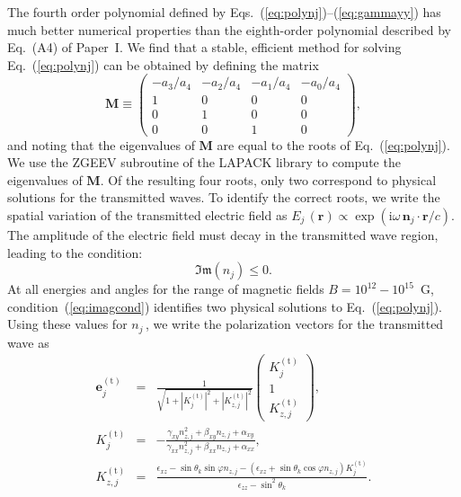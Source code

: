 \documentclass{aa}
\newcommand{\req}[1]{Eq.~(\ref{#1})}
\newcommand{\etrv}{\bm{e}^\mathrm{(t)}}
\begin{document}
The fourth order polynomial defined by
Eqs.~(\ref{eq:polynj})--(\ref{eq:gammayy}) has much
better numerical properties than the eighth-order polynomial
described by Eq.~(A4) of Paper~I.   We find that a
stable, efficient method for solving
\req{eq:polynj} can be obtained by  defining the
matrix
\begin{equation}
\mathbf{M} \equiv \left(\begin{array}{cccc}
-a_3/a_4 & -a_2/a_4 & -a_1/a_4 & -a_0/a_4\\
1 & 0 & 0 & 0\\
0 & 1 & 0 & 0\\
0 & 0 & 1 & 0
\end{array}\right),
\end{equation}
and noting that the eigenvalues of $\mathbf{M}$ are equal to
the roots of \req{eq:polynj}. We use the ZGEEV
subroutine of the  LAPACK library \citep{Anderson-ea99} to
compute the eigenvalues of $\mathbf{M}$. Of the resulting
four roots, only two correspond to physical solutions  for
the transmitted waves.  To identify the correct roots, we
write the spatial  variation of the transmitted electric
field as  $E_j\,(\bm{r}) \propto
\exp\left(\mathrm{i}\omega\,\bm{n}_j\cdot\bm{r}/c\right)$. 
The amplitude of  the electric field must decay in the
transmitted wave region, leading to the condition:
\begin{equation}
\label{eq:imagcond}
\mathfrak{Im}(n_j) \le 0.
\end{equation}
At all energies and angles for the range of magnetic fields
$B=10^{12}-10^{15}$~G,  condition~(\ref{eq:imagcond})
identifies two physical solutions to 
\req{eq:polynj}. Using these values for $n_j\,$,
we write the  polarization vectors for the transmitted wave
as
\begin{eqnarray}
\etrv_j & = & \frac{1}{\sqrt{1+|K_j^\mathrm{(t)}|^2
 + |K_{z,j}^\mathrm{(t)}|^2}}\left( \begin{array}{c}
     K_j^\mathrm{(t)} \\  1  \\  K_{z,j}^\mathrm{(t)}
     \end{array}
     \right),
\label{et}
     \\
K_j^\mathrm{(t)} & = & -\frac{\gamma_{xy}n_{z,j}^2+\beta_{xy} n_{z,j} +
\alpha_{xy}}
{\gamma_{xx} n_{z,j}^2 + \beta_{xx} n_{z,j} + \alpha_{xx}},\\
K_{z,j}^\mathrm{(t)} & = & \frac{
\epsilon_{xz} - \sin\theta_k\sin\varphi n_{z,j}
-\left(\epsilon_{xz}
 + \sin\theta_k\cos\varphi n_{z,j}\right) K_j^\mathrm{(t)}
    }{
    \epsilon_{zz} - \sin^2\theta_k}.
\end{eqnarray}
\end{document}

